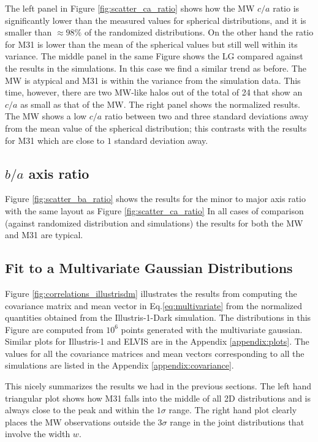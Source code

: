 \documentclass[a4paper,fleqn,usenatbib]{mnras}
\begin{document}
The left panel in Figure \ref{fig:scatter_ca_ratio} shows how the MW
$c/a$ ratio is significantly lower than the measured values for
spherical distributions, and it is smaller than $\approx 98\%$ of the
randomized distributions.   
On the other hand the ratio for M31 is lower than the mean of the
spherical values but still well within its variance.
The middle panel in the same Figure shows the LG compared against the
results in the simulations. 
In this case we find a similar trend as before. 
The MW is atypical and M31 is within the variance from the simulation data.
This time, however, there are two MW-like halos out of the total
of 24 that show an $c/a$ as small as that of the MW.
The right panel shows the normalized results. 
The MW shows a low $c/a$ ratio between two and three
standard deviations away from the mean value of the spherical
distribution; this contrasts with the results for M31 which are close to
$1$ standard deviation away. 


\subsection{$b/a$ axis ratio}

Figure \ref{fig:scatter_ba_ratio} shows the results for the minor to
major axis ratio with the same layout as Figure \ref{fig:scatter_ca_ratio}
In all cases of comparison (against randomized distribution
and simulations) the results for both the MW and M31 are typical. 


\subsection{Fit to a Multivariate Gaussian Distributions}

Figure \ref{fig:correlations_illustrisdm} illustrates the results from
 computing the covariance matrix and mean vector in
 Eq.\ref{eq:multivariate} from the normalized quantities obtained from
 the Illustris-1-Dark simulation.
The distributions in this Figure are computed from $10^6$ points
generated with the multivariate gaussian. 
Similar plots for Illustris-1 and ELVIS are in the Appendix \ref{appendix:plots}.
The values for all the covariance matrices and mean vectors
corresponding to all the simulations are listed in the Appendix \ref{appendix:covariance}.

This nicely summarizes the results we had in the previous
sections. The left hand triangular plot shows how M31 falls into the middle of all 2D
distributions and is always close to the peak and within the $1\sigma$
range. 
The right hand plot clearly places the MW observations outside the
$3\sigma$ range in the joint distributions that involve the width
$w$. 
\end{document}
